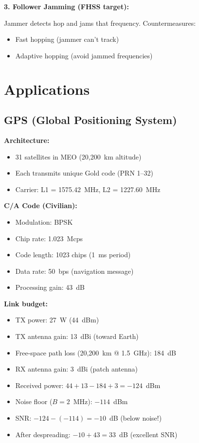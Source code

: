 \textbf{3. Follower Jamming (FHSS target):}

Jammer detects hop and jams that frequency. Countermeasures:
\begin{itemize}
\item Fast hopping (jammer can't track)
\item Adaptive hopping (avoid jammed frequencies)
\end{itemize}

\section{Applications}

\subsection{GPS (Global Positioning System)}

\textbf{Architecture:}
\begin{itemize}
\item 31 satellites in MEO (20,200~km altitude)
\item Each transmits unique Gold code (PRN 1--32)
\item Carrier: L1 = 1575.42~MHz, L2 = 1227.60~MHz
\end{itemize}

\textbf{C/A Code (Civilian):}
\begin{itemize}
\item Modulation: BPSK
\item Chip rate: 1.023~Mcps
\item Code length: 1023 chips (1~ms period)
\item Data rate: 50~bps (navigation message)
\item Processing gain: 43~dB
\end{itemize}

\textbf{Link budget:}
\begin{itemize}
\item TX power: 27~W (44~dBm)
\item TX antenna gain: 13~dBi (toward Earth)
\item Free-space path loss (20,200~km @ 1.5~GHz): 184~dB
\item RX antenna gain: 3~dBi (patch antenna)
\item Received power: $44 + 13 - 184 + 3 = -124$~dBm
\item Noise floor ($B = 2$~MHz): $-114$~dBm
\item SNR: $-124 - (-114) = -10$~dB (below noise!)
\item After despreading: $-10 + 43 = 33$~dB (excellent SNR)
\end{itemize}

